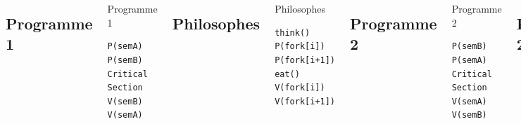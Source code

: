 \section{\sectitle}
\begin{frame}[containsverbatim]{\sectitle}

    \begin{columns}[t]
        \def\subsectitle{Programme 1}
        \subsection{\subsectitle}
        \begin{exampleblock}{\subsectitle}
            \begin{verbatim}
P(semA)
P(semB)
Critical Section
V(semB)
V(semA)
            \end{verbatim}
        \end{exampleblock}

        \def\subsectitle{Philosophes}
        \subsection{\subsectitle}
        \begin{exampleblock}{\subsectitle}
            \begin{verbatim}
think()
P(fork[i])
P(fork[i+1])
eat()
V(fork[i])
V(fork[i+1])
            \end{verbatim}
        \end{exampleblock}

        \def\subsectitle{Programme 2}
        \subsection{\subsectitle}
        \begin{exampleblock}{\subsectitle}
            \begin{verbatim}
P(semB)
P(semA)
Critical Section
V(semA)
V(semB)
            \end{verbatim}
        \end{exampleblock}

        \def\subsectitle{Programme 2}
        \subsection{\subsectitle}
        \begin{exampleblock}{\subsectitle}
            \begin{verbatim}
P(semA)
P(semB)
Critical Section
V(semB)
V(semA)
            \end{verbatim}
        \end{exampleblock}

    \end{columns}
\end{frame}




